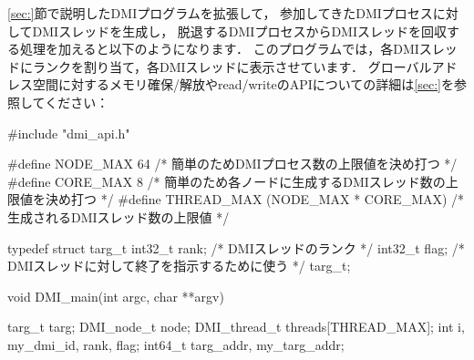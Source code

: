 \documentclass[report,12pt]{jsbook}
\begin{document}
\ref{sec:}節で説明したDMIプログラムを拡張して，
参加してきたDMIプロセスに対してDMIスレッドを生成し，
脱退するDMIプロセスからDMIスレッドを回収する処理を加えると以下のようになります．
このプログラムでは，各DMIスレッドにランクを割り当て，各DMIスレッドに表示させています．
グローバルアドレス空間に対するメモリ確保/解放やread/writeのAPIについての詳細は\ref{sec:}を参照してください：
\begin{code}
#include "dmi_api.h"

#define NODE_MAX 64  /* 簡単のためDMIプロセス数の上限値を決め打つ */
#define CORE_MAX 8  /* 簡単のため各ノードに生成するDMIスレッド数の上限値を決め打つ */
#define THREAD_MAX (NODE_MAX * CORE_MAX)  /* 生成されるDMIスレッド数の上限値 */

typedef struct targ_t
{
  int32_t rank;  /* DMIスレッドのランク */
  int32_t flag;  /* DMIスレッドに対して終了を指示するために使う */
}targ_t;

void DMI_main(int argc, char **argv)
{
  targ_t targ;
  DMI_node_t node;
  DMI_thread_t threads[THREAD_MAX];
  int i, my_dmi_id, rank, flag;
  int64_t targ_addr, my_targ_addr;

}
\end{code}
\end{document}
